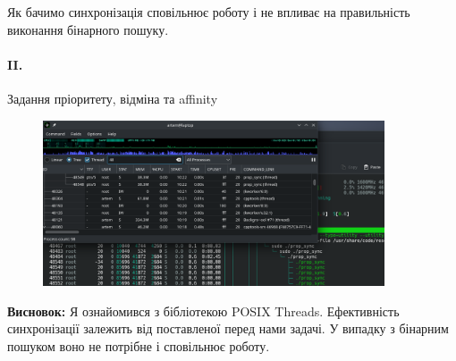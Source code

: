 \documentclass[12pt]{extarticle}
\begin{document}
Як бачимо синхронізація сповільнює роботу і не впливає на правильність виконання бінарного пошуку.



\paragraph{II.} Задання пріоритету, відміна та affinity
\begin{figure}[H]
    \centering
    \includegraphics[width=0.90\textwidth]{aff}
    \caption{}
\end{figure}

\textbf{Висновок:}
Я ознайомився з бібліотекою POSIX Threads.
Ефективність синхронізації залежить від поставленої перед нами задачі. У
випадку з бінарним пошуком воно не потрібне і сповільнює роботу.
 
\end{document}
